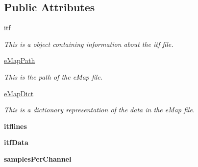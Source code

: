 \subsection*{Public Attributes}
\begin{DoxyCompactItemize}
\item 
\hyperlink{class_chassis_8git_1_1_waveform_chassis_1_1_waveform_chassis_a71d5648046e72865b346e57b83781eb4}{itf}
\begin{DoxyCompactList}\small\item\em This is a object containing information about the itf file. \end{DoxyCompactList}\item 
\hyperlink{class_chassis_8git_1_1_waveform_chassis_1_1_waveform_chassis_ae0368ac25643a170bdd6584ea3ea90cb}{e\-Map\-Path}
\begin{DoxyCompactList}\small\item\em This is the path of the e\-Map file. \end{DoxyCompactList}\item 
\hyperlink{class_chassis_8git_1_1_waveform_chassis_1_1_waveform_chassis_afe1eb500d55c8e701524b05749458642}{e\-Map\-Dict}
\begin{DoxyCompactList}\small\item\em This is a dictionary representation of the data in the e\-Map file. \end{DoxyCompactList}\item 
\hypertarget{class_chassis_8git_1_1_waveform_chassis_1_1_waveform_chassis_a28548fc866c3410f6eb58781341458a0}{{\bfseries itflines}}\label{class_chassis_8git_1_1_waveform_chassis_1_1_waveform_chassis_a28548fc866c3410f6eb58781341458a0}

\item 
\hypertarget{class_chassis_8git_1_1_waveform_chassis_1_1_waveform_chassis_af842d70f15e68a31ce3cf4fd8639060e}{{\bfseries itf\-Data}}\label{class_chassis_8git_1_1_waveform_chassis_1_1_waveform_chassis_af842d70f15e68a31ce3cf4fd8639060e}

\item 
\hypertarget{class_chassis_8git_1_1_waveform_chassis_1_1_waveform_chassis_ac83f0edd5f904f55a3b931ec99004513}{{\bfseries samples\-Per\-Channel}}\label{class_chassis_8git_1_1_waveform_chassis_1_1_waveform_chassis_ac83f0edd5f904f55a3b931ec99004513}

\end{DoxyCompactItemize}
